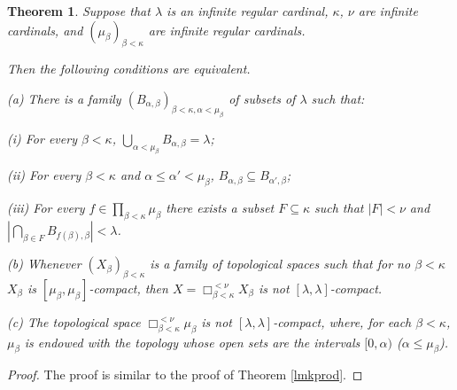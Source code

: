 \documentclass[12pt]{amsart}
\newtheorem{thm}[theorem]{Theorem}
\theoremstyle{definition}
\theoremstyle{remark}
\begin{document}
\begin{thm}\label{lmkprodgeneral} 
Suppose that  $ \lambda $ is an infinite regular cardinal, 
 $\kappa $, $ \nu$  are infinite cardinals,
and $(\mu_ \beta ) _{ \beta < \kappa } $ are infinite regular cardinals.  

Then the following conditions are equivalent.

\smallskip

(a) There is a family $ (B_{ \alpha , \beta }) _{  \beta<\kappa, \alpha<\mu_ \beta}  $ 
of subsets of $ \lambda $ such that:

(i) For every $ \beta<\kappa$, $\bigcup _{ \alpha<\mu_ \beta } B_{ \alpha , \beta  } = \lambda$;

(ii) For every $ \beta<\kappa$ and $ \alpha \leq \alpha ' < \mu_ \beta $, 
$ B_{ \alpha , \beta } \subseteq B_{ \alpha' , \beta }$;

(iii) For every $ f \in \prod _{ \beta < \kappa } \mu _ \beta $ 
there exists a subset
$F \subseteq \kappa  $ such that $|F|<\nu$ and 
$|\bigcap _{\beta \in F} B_{ f( \beta) , \beta }| < \lambda $.   

\smallskip

(b) Whenever
$(X_ \beta ) _{ \beta < \kappa }$ is a family of topological spaces 
such that  for no $ \beta < \kappa $ $X_ \beta $ is 
$[ \mu_ \beta, \mu_ \beta]$-compact,
then $X=\Box^{<\nu}_{ \beta < \kappa } X_ \beta $
is not  $[ \lambda , \lambda ]$-compact.

\smallskip

(c) The topological space $ \Box^{<\nu}_{ \beta < \kappa } \mu_ \beta  $ is not
$[ \lambda , \lambda ]$-compact, where, for each $ \beta < \kappa $,
$ \mu _ \beta $
is endowed with the topology whose open sets are the
intervals $ [0, \alpha) $ ($ \alpha \leq \mu _ \beta $).
\end{thm} 


\begin{proof} 
The proof is similar to the proof of Theorem \ref{lmkprod}.
\end{proof} 
\end{document}
